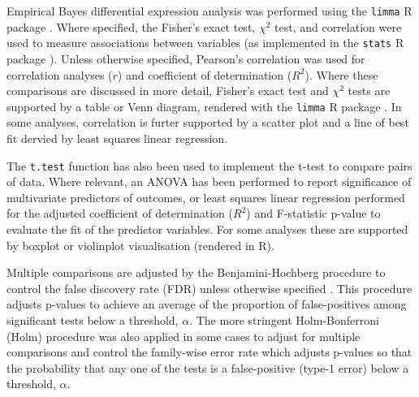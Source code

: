 Empirical Bayes differential expression analysis was performed using the \texttt{limma} R package \citep{limma}. Where specified, the Fisher's exact test, $\chi^2$ test, and correlation were used to measure associations between variables (as implemented in the \texttt{stats} R package \citep{R_core}). Unless otherwise specified, Pearson's correlation was used for correlation analyses ($r$) and coefficient of determination ($R^2$). Where these comparisons are discussed in more detail, Fisher's exact test and $\chi^2$ tests are supported by a table or Venn diagram, rendered with the \texttt{limma} R package \citep{limma}. In some analyses, correlation is furter supported by a scatter plot and a line of best fit dervied by least squares linear regression. 

The \texttt{t.test} function \citep{R_core} has also been used to implement the t-test to compare pairs of data. Where relevant, an \gls{ANOVA} has been performed to report significance of multivariate predictors of outcomes, or least squares linear regression performed for the adjusted coefficient of determination ($R^2$) and F-statistic p-value to evaluate the fit of the predictor variables. For some analyses these are supported by boxplot or violinplot visualisation (rendered in R).

Multiple comparisons are adjusted by the Benjamini-Hochberg procedure to control the false discovery rate (FDR) unless otherwise specified \citep{fdr1995}. This procedure adjusts p-values to achieve an average of the proportion of false-positives among significant tests below a threshold, $\alpha$. The more stringent Holm-Bonferroni (Holm) procedure \citep{Holm1979} was also applied in some cases to adjust for multiple comparisons and control the family-wise error rate which adjusts p-values so that the probability that any one of the tests is a false-positive (type-1 error) below a threshold, $\alpha$.

